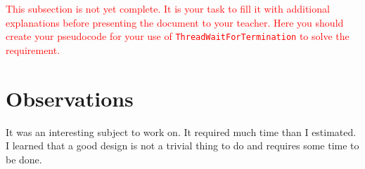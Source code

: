 \textcolor{red}{This subsection is not yet complete. It is your task to fill it with additional explanations before presenting the document to your teacher. Here you should create your pseudocode for your use of \lstinline|ThreadWaitForTermination| to solve the requirement.}

\section{Observations}

It was an interesting subject to work on. It required much time than I estimated. I learned that a good design is not a trivial thing to do and requires some time to be done.  

